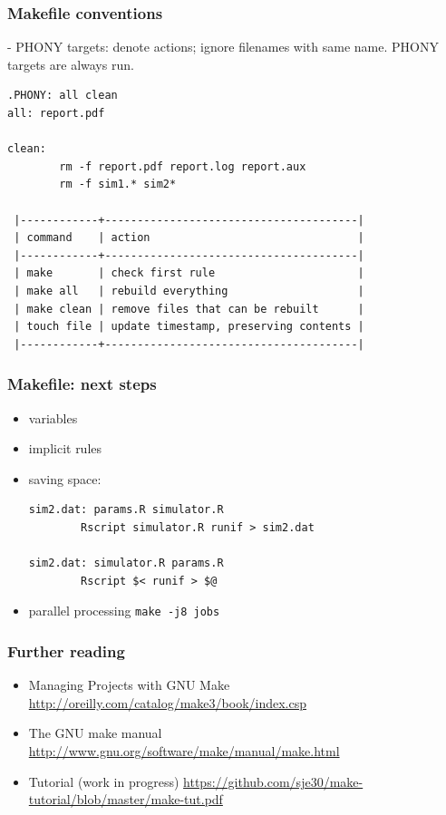 \documentclass[]{beamer}\usepackage[]{graphicx}\usepackage[]{color}
\begin{document}
\begin{frame}[fragile]
  \frametitle{Makefile conventions}

   - PHONY targets: denote actions; ignore filenames with same
     name. PHONY targets are always run.

\begin{verbatim}
.PHONY: all clean
all: report.pdf

clean:
        rm -f report.pdf report.log report.aux
        rm -f sim1.* sim2*

 |------------+---------------------------------------|
 | command    | action                                |
 |------------+---------------------------------------|
 | make       | check first rule                      |
 | make all   | rebuild everything                    |
 | make clean | remove files that can be rebuilt      |
 | touch file | update timestamp, preserving contents |
 |------------+---------------------------------------|
\end{verbatim}
\end{frame}



\begin{frame}[fragile]
  \frametitle{Makefile: next steps}

\begin{itemize}
\item variables
\item implicit rules
\item saving space:

\begin{verbatim}  
sim2.dat: params.R simulator.R
        Rscript simulator.R runif > sim2.dat

sim2.dat: simulator.R params.R
        Rscript $< runif > $@
\end{verbatim}
  
\item parallel processing \texttt{make -j8 jobs}
\end{itemize}

\end{frame}



\begin{frame}
  \frametitle{Further reading}
  \begin{itemize}
  \item Managing Projects with GNU Make \url{http://oreilly.com/catalog/make3/book/index.csp}

\item The GNU make manual \url{http://www.gnu.org/software/make/manual/make.html}

\item Tutorial (work in progress) \url{https://github.com/sje30/make-tutorial/blob/master/make-tut.pdf}
  \end{itemize}

\end{frame}
\end{document}
